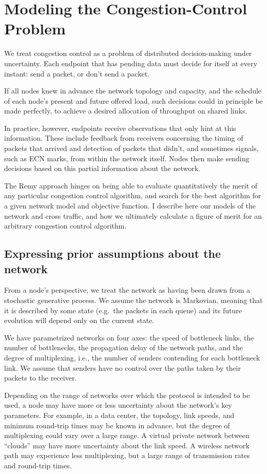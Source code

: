 \section{Modeling the Congestion-Control Problem}
\label{s:model}

We treat congestion control as a problem of distributed
decision-making under uncertainty. Each endpoint that has pending data
must decide for itself at every instant: send a packet, or don't
send a packet.

If all nodes knew in advance the network topology and capacity, and the
schedule of each node's present and future offered load, such
decisions could in principle be made perfectly, to achieve a desired
allocation of throughput on shared links.

In practice, however, endpoints receive observations that only hint at
this information. These include feedback from receivers concerning the
timing of packets that arrived and detection of packets that didn't, and
sometimes signals, such as ECN marks, from within the network itself.
Nodes then make sending decisions based on this partial information
about the network.

The Remy approach hinges on being able to evaluate quantitatively the
merit of any particular congestion control algorithm, and search for
the best algorithm for a given network model and objective function. I
describe here our models of the network and cross traffic, and how we
ultimately calculate a figure of merit for an arbitrary congestion
control algorithm.

\subsection{Expressing prior assumptions about the network}

From a node's perspective, we treat the network as having been drawn
from a stochastic generative process. We assume the network is
Markovian, meaning that it is described by some state (e.g.~the
packets in each queue) and its future evolution will depend only on
the current state.

We have parametrized networks on four axes: the speed of
bottleneck links, the number of bottlenecks, the propagation delay of the network paths, and the
degree of multiplexing, i.e., the number of senders contending for
each bottleneck link. We assume that senders have no control over the
paths taken by their packets to the receiver.

Depending on the range of networks over which the protocol is intended
to be used, a node may have more or less uncertainty about the
network's key parameters. For example, in a data center, the topology,
link speeds, and minimum round-trip times may be known in advance, but
the degree of multiplexing could vary over a large range. A virtual
private network between ``clouds'' may have more uncertainty about the
link speed. A wireless network path may experience less multiplexing,
but a large range of transmission rates and round-trip times.

